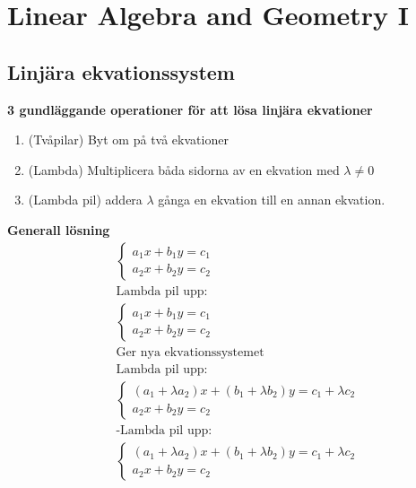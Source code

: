 \chapter{Linear Algebra and Geometry I}
\newcommand{\imagesLagI}{image/chap7_lagI}

\newpage

\begin{multicols}{2}
\section{Linjära ekvationssystem}

\textbf{3 gundläggande operationer för att lösa linjära ekvationer}
\begin{enumerate}
  \item (Tvåpilar) Byt om på två ekvationer
  \item (Lambda) Multiplicera båda sidorna av en ekvation med $\lambda \neq 0$
  \item (Lambda pil) addera $\lambda$ gånga en ekvation till en annan ekvation.
\end{enumerate}


\textbf{Generall lösning}
\begin{align*}
  &\left\{\begin{array}{l}
  a_{1} x+b_{1} y=c_{1} \\
  a_{2} x+b_{2} y=c_{2}
  \end{array}\right. \\
  &\text{Lambda pil upp:} \\
  &\left\{\begin{array}{l}
  a_{1} x+b_{1} y=c_{1} \\
  a_{2} x+b_{2} y=c_{2}
  \end{array}\right. \\
  &\text{Ger nya ekvationssystemet} \\
  &\text{Lambda pil upp:} \\
  &\left\{\begin{array}{l}
  (a_{1}+\lambda a_{2})x + (b_{1}+\lambda b_{2})y=c_{1} + \lambda c_{2} \\
  a_{2} x+b_{2} y=c_{2}
  \end{array}\right. \\
  &\text{-Lambda pil upp:} \\
  &\left\{\begin{array}{l}
  (a_{1}+\lambda a_{2})x + (b_{1}+\lambda b_{2})y=c_{1} + \lambda c_{2} \\
  a_{2} x+b_{2} y=c_{2}
  \end{array}\right.
\end{align*}


\end{multicols}
